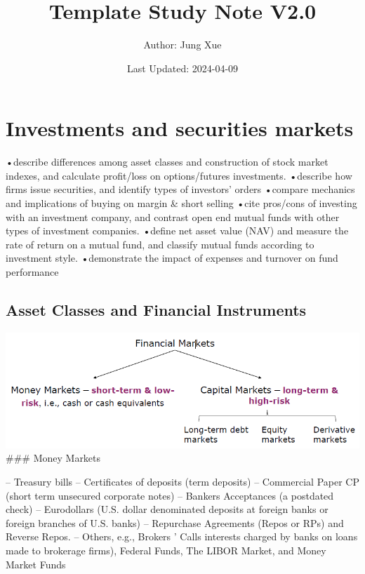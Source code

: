 \documentclass[
]{book}
\title{Template Study Note V2.0}
\author{Author: Jung Xue}
\date{Last Updated: 2024-04-09}
\begin{document}
\maketitle

{
\setcounter{tocdepth}{1}
\tableofcontents
}
\hypertarget{ch1}{%
\chapter{Investments and securities markets}\label{ch1}}

•describe differences among asset classes and construction of stock market indexes, and calculate profit/loss on options/futures investments.
•describe how firms issue securities, and identify types of investors' orders
•compare mechanics and implications of buying on margin \& short selling
•cite pros/cons of investing with an investment company, and contrast open end mutual funds with other types of investment companies.
•define net asset value (NAV) and measure the rate of return on a mutual fund, and classify mutual funds according to investment style.
•demonstrate the impact of expenses and turnover on fund performance

\hypertarget{asset-classes-and-financial-instruments}{%
\section{Asset Classes and Financial Instruments}\label{asset-classes-and-financial-instruments}}

\includegraphics{Resources/Financialmarkets.png}
\#\#\# Money Markets

-- Treasury bills
-- Certificates of deposits (term deposits)
-- Commercial Paper CP (short term unsecured corporate notes)
-- Bankers Acceptances (a postdated check)
-- Eurodollars (U.S. dollar denominated deposits at foreign banks or foreign branches of U.S. banks)
-- Repurchase Agreements (Repos or RPs) and Reverse Repos.
-- Others, e.g., Brokers ' Calls interests charged by banks on loans made to brokerage firms), Federal Funds, The LIBOR Market, and Money Market Funds
\end{document}
